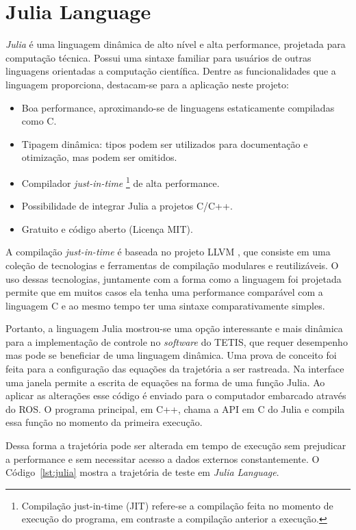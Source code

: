 \section{Julia Language}

\textit{Julia} é uma linguagem dinâmica de alto nível e alta performance, projetada para computação técnica. Possui uma sintaxe familiar para usuários de outras linguagens orientadas a computação científica. Dentre as funcionalidades que a linguagem proporciona, destacam-se para a aplicação neste projeto:

\begin{itemize}
\item Boa performance, aproximando-se de linguagens estaticamente compiladas como C.
\item Tipagem dinâmica: tipos podem ser utilizados para documentação e otimização, mas podem ser omitidos.
\item Compilador \textit{just-in-time} \footnote{Compilação just-in-time (JIT) refere-se a compilação feita no momento de execução do programa, em contraste a compilação anterior a execução.} de alta performance.
\item Possibilidade de integrar Julia a projetos C/C++.
\item Gratuito e código aberto (Licença MIT).
\end{itemize}

A compilação \textit{just-in-time} é baseada no projeto LLVM \citep{llvmorg,lattner2004llvm}, que consiste em uma coleção de tecnologias e ferramentas de compilação modulares e reutilizáveis. O uso dessas tecnologias, juntamente com a forma como a linguagem foi projetada permite que em muitos casos ela tenha uma performance comparável com a linguagem C e ao mesmo tempo ter uma sintaxe comparativamente simples.

Portanto, a linguagem Julia mostrou-se uma opção interessante e mais dinâmica para a implementação de controle no \textit{software} do TETIS, que requer desempenho mas pode se beneficiar de uma linguagem dinâmica. Uma prova de conceito foi feita para a configuração das equações da trajetória a ser rastreada. Na interface uma janela permite a escrita de equações na forma de uma função Julia. Ao aplicar as alterações esse código é enviado para o computador embarcado através do ROS. O programa principal, em C++, chama a API em C do Julia e compila essa função no momento da primeira execução.

Dessa forma a trajetória pode ser alterada em tempo de execução sem prejudicar a performance e sem necessitar acesso a dados externos constantemente. O Código~\ref{lst:julia} mostra a trajetória de teste em \textit{Julia Language}.

